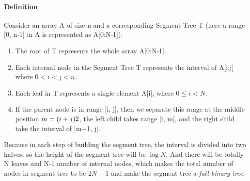\documentclass[data-structure.tex]{subfiles}
\begin{document}
\paragraph{Definition} Consider an array A of size n and a corresponding Segment Tree T (here a range [0, n-1] in A is represented as A[0:N-1]):
\begin{enumerate}
    \item The root of T represents the whole array A[0:N-1]. 
    \item Each internal node in the Segment Tree T represents the interval of A[i:j] where $0 < i < j < n$. 
    \item Each leaf in T represents a single element A[i], where $0 \leq i<N$. 
    \item If the parent node is in range [i, j], then we separate this range at the middle position $m = (i+j)\/\/2$, the left child takes range [i, m], and the right child take the interval of [m+1, j].
\end{enumerate}

Because in each step of building the segment tree, the interval is divided into two halves, so the height of the segment tree will be $\log N$. And there will be totally N leaves and N-1 number of internal nodes, which makes the total number of nodes in segment tree to be $2N-1$ and make the segment tree a \textit{full binary tree}.
\end{document}
